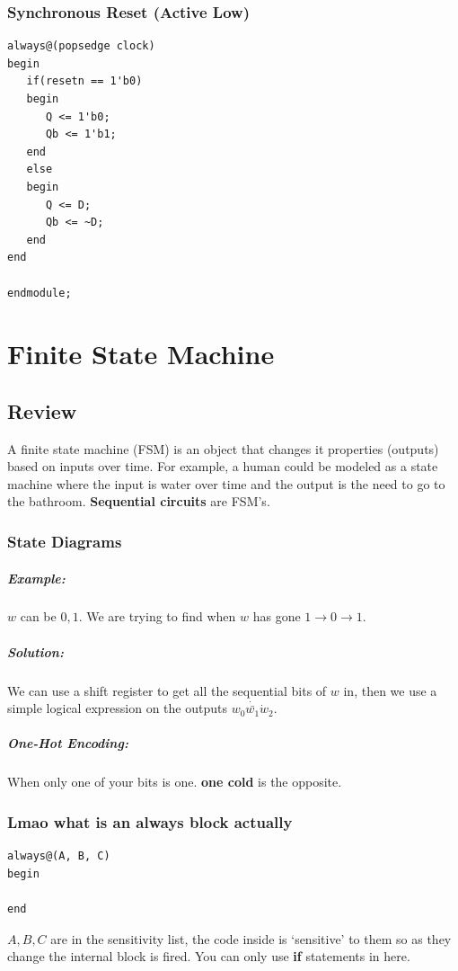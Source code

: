 \documentclass[a4paper,12pt]{report}
\begin{document}
\subsection{Synchronous Reset (Active Low)}
\begin{lstlisting}
always@(popsedge clock)
begin
   if(resetn == 1'b0)
   begin
      Q <= 1'b0;
      Qb <= 1'b1;
   end
   else 
   begin
      Q <= D;
      Qb <= ~D;
   end
end 

endmodule;

\end{lstlisting}

\chapter{Finite State Machine}
\section{Review}
A finite state machine (FSM) is an object that changes it properties (outputs) 
based on inputs over time. For example, a human could be modeled as a state machine 
where the input is water over time and the output is the need to go to the bathroom. 
\textbf{Sequential circuits} are FSM's.

\subsection{State Diagrams}
\paragraph{Example: } $w$ can be $0, 1$. We are trying to find when $w$ has gone 
$1 \to 0 \to 1$. 
\paragraph{Solution: } We can use a shift register to get all 
the sequential bits of $w$ in, then we use a simple logical expression on the outputs
$w_0 \dot \bar{w_1} \dot w_2$. 

\paragraph{One-Hot Encoding: } When only one of your bits is one. \textbf{one cold} 
is the opposite.

\subsection{Lmao what is an always block actually}
\begin{lstlisting}
always@(A, B, C)
begin

end
\end{lstlisting}
$A, B, C$ are in the sensitivity list, the code inside is `sensitive' to them so 
as they change the internal block is fired. You can only use \textbf{if} statements 
in here. 
\end{document}
